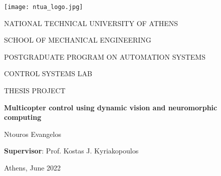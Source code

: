     \begin{center}
    
    \texttt{[image: ntua\_logo.jpg]}
    
    \vspace{5mm}
    
    {\small NATIONAL TECHNICAL UNIVERSITY OF ATHENS}
    
    {\small SCHOOL OF MECHANICAL ENGINEERING}
    
    \vspace{5mm}
    
    {\footnotesize POSTGRADUATE PROGRAM ON AUTOMATION SYSTEMS}
    
    {\footnotesize CONTROL SYSTEMS LAB}
    
    \vspace{5mm}
    
    {\small THESIS PROJECT}
    
    \textbf{{\Huge Multicopter control using dynamic vision and neuromorphic computing}}

    \vspace{20mm}

    {\Large Ntouros Evangelos}
    
    \vspace{20mm}
    
    \textbf{Supervisor}: Prof. Kostas J. Kyriakopoulos 
    
    \vspace{20mm}
    
    Athens, June 2022
    
    \end{center}
